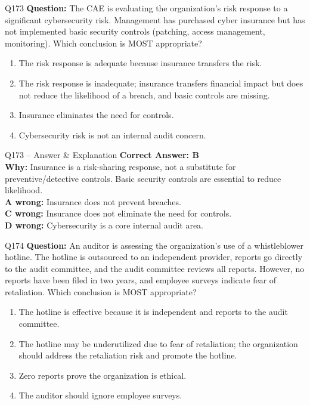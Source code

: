 \documentclass[aspectratio=169,10pt]{beamer}
\begin{document}
	\begin{frame}[t]{Q173}
		\small
		\textbf{Question:} The CAE is evaluating the organization's risk response to a significant cybersecurity risk. Management has purchased cyber insurance but has not implemented basic security controls (patching, access management, monitoring). Which conclusion is MOST appropriate?
		\begin{enumerate}[label=\Alph*.,itemsep=1pt,topsep=2pt]
			\item The risk response is adequate because insurance transfers the risk.
			\item The risk response is inadequate; insurance transfers financial impact but does not reduce the likelihood of a breach, and basic controls are missing.
			\item Insurance eliminates the need for controls.
			\item Cybersecurity risk is not an internal audit concern.
		\end{enumerate}
	\end{frame}
	
	\begin{frame}[t]{Q173 -- Answer \& Explanation}
		\small
		\textbf{Correct Answer: B} \\[4pt]
		\textbf{Why:} Insurance is a risk-sharing response, not a substitute for preventive/detective controls. Basic security controls are essential to reduce likelihood. \\[4pt]
		\textbf{A wrong:} Insurance does not prevent breaches. \\[2pt]
		\textbf{C wrong:} Insurance does not eliminate the need for controls. \\[2pt]
		\textbf{D wrong:} Cybersecurity is a core internal audit area.
	\end{frame}
	
	\begin{frame}[t]{Q174}
		\small
		\textbf{Question:} An auditor is assessing the organization's use of a whistleblower hotline. The hotline is outsourced to an independent provider, reports go directly to the audit committee, and the audit committee reviews all reports. However, no reports have been filed in two years, and employee surveys indicate fear of retaliation. Which conclusion is MOST appropriate?
		\begin{enumerate}[label=\Alph*.,itemsep=1pt,topsep=2pt]
			\item The hotline is effective because it is independent and reports to the audit committee.
			\item The hotline may be underutilized due to fear of retaliation; the organization should address the retaliation risk and promote the hotline.
			\item Zero reports prove the organization is ethical.
			\item The auditor should ignore employee surveys.
		\end{enumerate}
	\end{frame}
	
\end{document}
